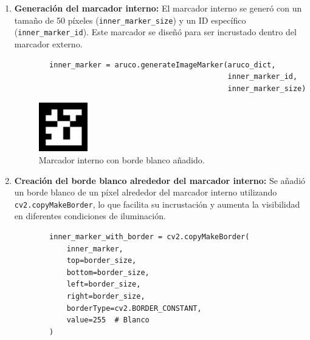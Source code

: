 \begin{enumerate}
        \item \textbf{Generación del marcador interno:} 
        El marcador interno se generó con un tamaño de 50 píxeles (\texttt{inner\_marker\_size}) y un ID específico (\texttt{inner\_marker\_id}). Este marcador se diseñó para ser incrustado dentro del marcador externo.
        \begin{verbatim}
        inner_marker = aruco.generateImageMarker(aruco_dict, 
                                                 inner_marker_id, 
                                                 inner_marker_size)
        \end{verbatim}

        \begin{center}
            \begin{figure}[h!]
                \centering
                \includegraphics[width=0.2\textwidth]{pictures/aruco_marker_100.png}
                \caption{Marcador interno con borde blanco añadido.}
            \end{figure}
        \end{center}
    
        \item \textbf{Creación del borde blanco alrededor del marcador interno:} 
        Se añadió un borde blanco de un píxel alrededor del marcador interno utilizando \texttt{cv2.copyMakeBorder}, lo que facilita su incrustación y aumenta la visibilidad en diferentes condiciones de iluminación.
        \begin{verbatim}
        inner_marker_with_border = cv2.copyMakeBorder(
            inner_marker,
            top=border_size,
            bottom=border_size,
            left=border_size,
            right=border_size,
            borderType=cv2.BORDER_CONSTANT,
            value=255  # Blanco
        )
        \end{verbatim}
        

\end{enumerate}
